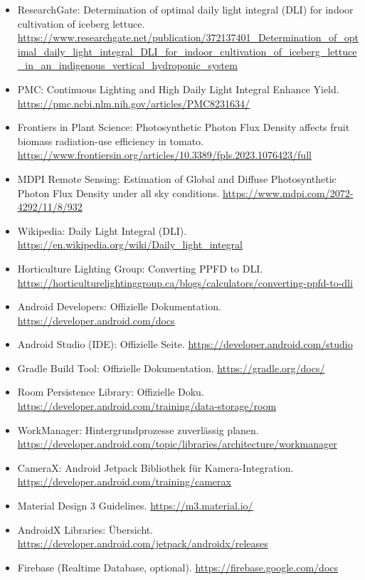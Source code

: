 \documentclass[14pt,a4paper]{report}
\begin{document}
\begin{itemize}
    \item ResearchGate: Determination of optimal daily light integral (DLI) for indoor cultivation of iceberg lettuce. \url{https://www.researchgate.net/publication/372137401_Determination_of_optimal_daily_light_integral_DLI_for_indoor_cultivation_of_iceberg_lettuce_in_an_indigenous_vertical_hydroponic_system}
    \item PMC: Continuous Lighting and High Daily Light Integral Enhance Yield. \url{https://pmc.ncbi.nlm.nih.gov/articles/PMC8231634/}
    \item Frontiers in Plant Science: Photosynthetic Photon Flux Density affects fruit biomass radiation-use efficiency in tomato. \url{https://www.frontiersin.org/articles/10.3389/fpls.2023.1076423/full}
    \item MDPI Remote Sensing: Estimation of Global and Diffuse Photosynthetic Photon Flux Density under all sky conditions. \url{https://www.mdpi.com/2072-4292/11/8/932}
    \item Wikipedia: Daily Light Integral (DLI). \url{https://en.wikipedia.org/wiki/Daily_light_integral}
    \item Horticulture Lighting Group: Converting PPFD to DLI. \url{https://horticulturelightinggroup.ca/blogs/calculators/converting-ppfd-to-dli}

    \item Android Developers: Offizielle Dokumentation. \url{https://developer.android.com/docs}
    \item Android Studio (IDE): Offizielle Seite. \url{https://developer.android.com/studio}
    \item Gradle Build Tool: Offizielle Dokumentation. \url{https://gradle.org/docs/}
    \item Room Persistence Library: Offizielle Doku. \url{https://developer.android.com/training/data-storage/room}
    \item WorkManager: Hintergrundprozesse zuverlässig planen. \url{https://developer.android.com/topic/libraries/architecture/workmanager}
    \item CameraX: Android Jetpack Bibliothek für Kamera-Integration. \url{https://developer.android.com/training/camerax}
    \item Material Design 3 Guidelines. \url{https://m3.material.io/}
    \item AndroidX Libraries: Übersicht. \url{https://developer.android.com/jetpack/androidx/releases}
    \item Firebase (Realtime Database, optional). \url{https://firebase.google.com/docs}
    

\end{itemize}
\end{document}
